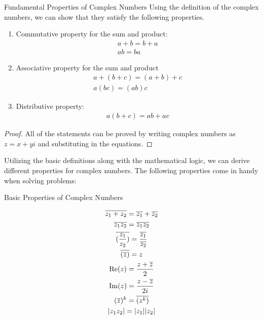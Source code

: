 \begin{propbox}{Fundamental Properties of Complex Numbers}
Using the definition of the complex numbers, we can show that they satisfy the following properties. \\

\begin{enumerate}

\item Commutative property for the sum and product: 
\begin{gather}
a + b = b + a \\
ab = ba
\end{gather}

\item Associative property for the sum and product
\begin{gather}
a + (b+c) = (a+b) + c \\
a(bc) = (ab)c
\end{gather}

\item Distributive property:
\begin{gather}
a (b+c) = ab + ac
\end{gather}



\end{enumerate}
\end{propbox}

\begin{proof}
All of the statements can be proved by writing complex numbers as $z = x+yi$ and substituting in the equations.
\end{proof}

Utilizing the basic definitions along with the mathematical logic, we can derive different properties for complex numbers. The following properties come in handy when solving problems:

\begin{propbox}{Basic Properties of Complex Numbers}

\begin{gather}
\overline{z_1 + z_2} = \overline{z_1} + \overline{z_2} \\
\overline{z_1 z_2} = \overline{z_1} \overline{z_2} \\
\overline{(\frac{z_1}{z_2})} = \frac{\overline{z_1}}{\overline{z_2}}  \\
\overline{(\overline{z})} = z \\
\operatorname{Re}(z) = \frac{z + \overline{z}}{2} \\
\operatorname{Im}(z) = \frac{z - \overline{z}}{2i} \\
(\overline{z})^k = \overline{(z^k)} \\
|z_1 z_2| = |z_1||z_2|
\end{gather}

\end{propbox}

